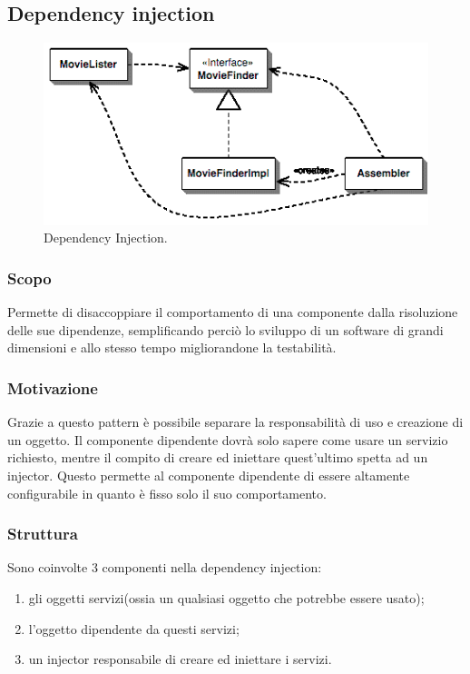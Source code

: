 
\subsection{Dependency injection}

\begin{figure}[H] \label{fig:injector}
	\includegraphics[scale=0.8]{img/injector.png}
	\caption{Dependency Injection.}
\end{figure}

\subsubsection{Scopo} Permette di disaccoppiare il comportamento di una componente dalla risoluzione delle sue dipendenze, semplificando perciò lo sviluppo di un software di grandi dimensioni e allo stesso tempo migliorandone la testabilità.

\subsubsection{Motivazione} Grazie a questo pattern è possibile separare la responsabilità di uso e creazione di un oggetto. Il componente dipendente dovrà solo sapere come usare un servizio richiesto, mentre il compito di creare ed iniettare quest'ultimo spetta ad un injector. Questo permette al componente dipendente di essere altamente configurabile in quanto è fisso solo il suo comportamento.

\subsubsection{Struttura} Sono coinvolte 3 componenti nella dependency injection:
\begin{enumerate}
	\item gli oggetti servizi(ossia un qualsiasi oggetto che potrebbe essere usato);
	\item l'oggetto dipendente da questi servizi;
	\item un injector responsabile di creare ed iniettare i servizi.
\end{enumerate}

